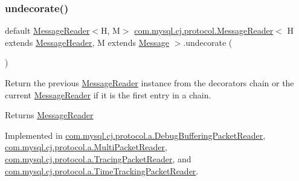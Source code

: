 \mbox{\label{interfacecom_1_1mysql_1_1cj_1_1protocol_1_1_message_reader_a59b0e118857c167ad4a270845f19e89b}} 
\subsubsection{\texorpdfstring{undecorate()}{undecorate()}}
{\footnotesize\ttfamily default \mbox{\hyperlink{interfacecom_1_1mysql_1_1cj_1_1protocol_1_1_message_reader}{Message\+Reader}}$<$H, M$>$ \mbox{\hyperlink{interfacecom_1_1mysql_1_1cj_1_1protocol_1_1_message_reader}{com.\+mysql.\+cj.\+protocol.\+Message\+Reader}}$<$ H extends \mbox{\hyperlink{interfacecom_1_1mysql_1_1cj_1_1protocol_1_1_message_header}{Message\+Header}}, M extends \mbox{\hyperlink{interfacecom_1_1mysql_1_1cj_1_1protocol_1_1_message}{Message}} $>$.undecorate (\begin{DoxyParamCaption}{ }\end{DoxyParamCaption})}

Return the previous \mbox{\hyperlink{interfacecom_1_1mysql_1_1cj_1_1protocol_1_1_message_reader}{Message\+Reader}} instance from the decorators chain or the current \mbox{\hyperlink{interfacecom_1_1mysql_1_1cj_1_1protocol_1_1_message_reader}{Message\+Reader}} if it is the first entry in a chain.

\begin{DoxyReturn}{Returns}
\mbox{\hyperlink{interfacecom_1_1mysql_1_1cj_1_1protocol_1_1_message_reader}{Message\+Reader}} 
\end{DoxyReturn}


Implemented in \mbox{\hyperlink{classcom_1_1mysql_1_1cj_1_1protocol_1_1a_1_1_debug_buffering_packet_reader_a9e51a1437df97c27971470ee4df5ab83}{com.\+mysql.\+cj.\+protocol.\+a.\+Debug\+Buffering\+Packet\+Reader}}, \mbox{\hyperlink{classcom_1_1mysql_1_1cj_1_1protocol_1_1a_1_1_multi_packet_reader_a88dba17bd898d3e8516fdb4a096297c5}{com.\+mysql.\+cj.\+protocol.\+a.\+Multi\+Packet\+Reader}}, \mbox{\hyperlink{classcom_1_1mysql_1_1cj_1_1protocol_1_1a_1_1_tracing_packet_reader_a5fab05e4e4ab55adf0f0755d7ca6513d}{com.\+mysql.\+cj.\+protocol.\+a.\+Tracing\+Packet\+Reader}}, and \mbox{\hyperlink{classcom_1_1mysql_1_1cj_1_1protocol_1_1a_1_1_time_tracking_packet_reader_aebbbca667b7f55074795c128c2aff259}{com.\+mysql.\+cj.\+protocol.\+a.\+Time\+Tracking\+Packet\+Reader}}.

